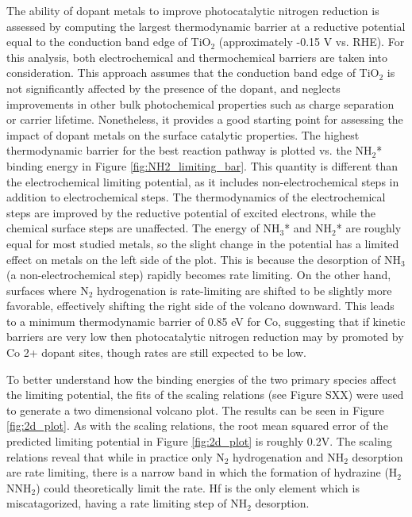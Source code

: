 The ability of dopant metals to improve photocatalytic nitrogen reduction is assessed by computing the largest thermodynamic barrier at a reductive potential equal to the conduction band edge of TiO$_2$ (approximately -0.15 V vs. RHE). For this analysis, both electrochemical and thermochemical barriers are taken into consideration. This approach assumes that the conduction band edge of TiO$_2$ is not significantly affected by the presence of the dopant, and neglects improvements in other bulk photochemical properties such as charge separation or carrier lifetime. Nonetheless, it provides a good starting point for assessing the impact of dopant metals on the surface catalytic properties.
The highest thermodynamic barrier for the best reaction pathway is plotted vs. the NH$_2$* binding energy in Figure \ref{fig:NH2_limiting_bar}. This quantity is different than the electrochemical limiting potential, as it includes non-electrochemical steps in addition to electrochemical steps. The thermodynamics of the electrochemical steps are improved by the reductive potential of excited electrons, while the chemical surface steps are unaffected. The energy of NH$_3$* and  NH$_2$* are roughly equal for most studied metals, so the slight change in the potential has a limited effect on metals on the left side of the plot. This is because the desorption of NH$_3$ (a non-electrochemical step) rapidly becomes rate limiting. On the other hand, surfaces where N$_2$ hydrogenation is rate-limiting are shifted to be slightly more favorable, effectively shifting the right side of the volcano downward. This leads to a minimum thermodynamic barrier of 0.85 eV for Co, suggesting that if kinetic barriers are very low then photocatalytic nitrogen reduction may by promoted by Co 2+ dopant sites, though rates are still expected to be low.

To better understand how the binding energies of the two primary species affect the limiting potential, the fits of the scaling relations (see Figure SXX) were used to generate a two dimensional volcano plot. The results can be seen in Figure \ref{fig:2d_plot}. As with the scaling relations, the root mean squared error of the predicted limiting potential in Figure \ref{fig:2d_plot} is roughly 0.2V.  The scaling relations reveal that while in practice only N$_2$ hydrogenation and NH$_2$ desorption are rate limiting, there is a narrow band in which the formation of hydrazine (H$_2$NNH$_2$) could theoretically limit the rate. Hf is the only element which is miscatagorized, having a rate limiting step of NH$_2$ desorption.


